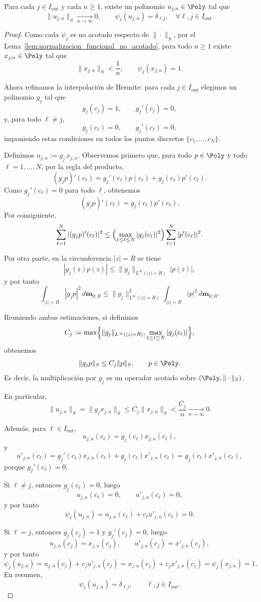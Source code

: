 \begin{lem}\label{lem:paquetes_diagonales}
	Para cada $j\in I_{\mathrm{out}}$ y cada $n\ge1$, existe un polinomio $u_{j,n}\in\Poly$ tal que
	\[
		\|u_{j,n}\|_S\xrightarrow[n\to\infty]{}0,
		\qquad
		\psi_\ell(u_{j,n})=\delta_{\ell j},
		\quad \forall \ell,j\in I_{\mathrm{out}}.
	\]
\end{lem}
\begin{proof}
	Como cada $\psi_j$ es no acotado respecto de $\|\cdot\|_S$, por el
	Lema~\ref{lem:normalizacion_funcional_no_acotado}, para todo $n\ge1$
	existe $x_{j,n}\in \Poly$ tal que
	\[
		\|x_{j,n}\|_S<\frac1n,
		\qquad
		\psi_j(x_{j,n})=1.
	\]

	Ahora refinamos la interpolación de Hermite: para cada $j\in I_{\mathrm{out}}$ elegimos
	un polinomio $g_j$ tal que
	\[
		g_j(c_j)=1,\qquad g_j'(c_j)=0,
	\]
	y, para todo $\ell\neq j$,
	\[
		g_j(c_\ell)=0,\qquad g_j'(c_\ell)=0,
	\]
	imponiendo estas condiciones en todos los puntos discretos
	$\{c_1,\dots,c_N\}$.

	Definimos $u_{j,n}:=g_j\,x_{j,n}$. Observemos primero que, para todo $p\in\Poly$ y todo $\ell=1,\dots,N$,
	por la regla del producto,
	\[
		(g_jp)'(c_\ell)
		=
		g_j'(c_\ell)p(c_\ell)+g_j(c_\ell)p'(c_\ell).
	\]
	Como $g_j'(c_\ell)=0$ para todo $\ell$, obtenemos
	\[
		(g_jp)'(c_\ell)=g_j(c_\ell)p'(c_\ell).
	\]
	Por consiguiente,
	\[
		\sum_{\ell=1}^N |(g_jp)'(c_\ell)|^2
		\le
		\Bigl(\max_{1\le \ell\le N}|g_j(c_\ell)|^2\Bigr)
		\sum_{\ell=1}^N |p'(c_\ell)|^2.
	\]

	Por otra parte, en la circunferencia $|z|=R$ se tiene
	\[
		|g_j(z)p(z)|
		\le
		\|g_j\|_{L^\infty(|z|=R)}\,|p(z)|,
	\]
	y por tanto
	\[
		\int_{|z|=R}|g_jp|^2\,d\mathbf{m}_{0;R}
		\le
		\|g_j\|_{L^\infty(|z|=R)}^2
		\int_{|z|=R}|p|^2\,d\mathbf{m}_{0;R}.
	\]

	Reuniendo ambas estimaciones, si definimos
	\[
		C_j:=
		\max\Bigl\{
		\|g_j\|_{L^\infty(|z|=R)},
		\max_{1\le \ell\le N}|g_j(c_\ell)|
		\Bigr\},
	\]
	obtenemos
	\[
		\|g_jp\|_S\le C_j\|p\|_S,
		\qquad p\in\Poly.
	\]
	Es decir, la multiplicación por $g_j$ es un operador acotado sobre
	$(\Poly,\|\cdot\|_S)$.

	En particular,
	\[
		\|u_{j,n}\|_S=\|g_jx_{j,n}\|_S\le C_j\|x_{j,n}\|_S<\frac{C_j}{n}\xrightarrow[n\to\infty]{}0.
	\]

	Además, para $\ell\in I_{\mathrm{out}}$,
	\[
		u_{j,n}(c_\ell)=g_j(c_\ell)x_{j,n}(c_\ell),
	\]
	y
	\[
		u'_{j,n}(c_\ell)=g_j'(c_\ell)x_{j,n}(c_\ell)+g_j(c_\ell)x'_{j,n}(c_\ell)
		=g_j(c_\ell)x'_{j,n}(c_\ell),
	\]
	porque $g_j'(c_\ell)=0$.

	Si $\ell\neq j$, entonces $g_j(c_\ell)=0$, luego
	\[
		u_{j,n}(c_\ell)=0,
		\qquad
		u'_{j,n}(c_\ell)=0,
	\]
	y por tanto
	\[
		\psi_\ell(u_{j,n})=u_{j,n}(c_\ell)+c_\ell u'_{j,n}(c_\ell)=0.
	\]

	Si $\ell=j$, entonces $g_j(c_j)=1$ y $g_j'(c_j)=0$, luego
	\[
		u_{j,n}(c_j)=x_{j,n}(c_j),
		\qquad
		u'_{j,n}(c_j)=x'_{j,n}(c_j),
	\]
	y por tanto
	\[
		\psi_j(u_{j,n})
		=
		u_{j,n}(c_j)+c_j u'_{j,n}(c_j)
		=
		x_{j,n}(c_j)+c_jx'_{j,n}(c_j)
		=
		\psi_j(x_{j,n})=1.
	\]
	En resumen,
	\[
		\psi_\ell(u_{j,n})=\delta_{\ell j},
		\qquad \ell,j\in I_{\mathrm{out}}.
	\]
\end{proof}

